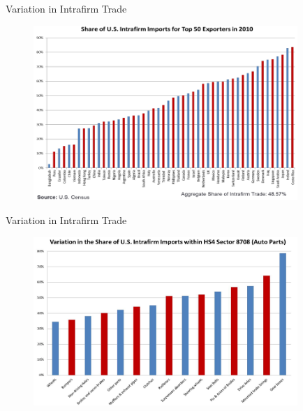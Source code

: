 \documentclass[10pt,hyperref={CJKbookmarks=true},xcolor=dvipsnames,aspectratio=169]{beamer}
\begin{document}
\begin{frame}{Variation in Intrafirm Trade }


\begin{figure}


\begin{centering}
\includegraphics[width=10cm]{fig/fdi/lec7-8}
\par\end{centering}

\end{figure}

\end{frame}

\begin{frame}{Variation in Intrafirm Trade}


\begin{figure}


\begin{centering}
\includegraphics[width=10cm]{fig/fdi/lec7-9}
\par\end{centering}

\end{figure}

\end{frame}
\end{document}
